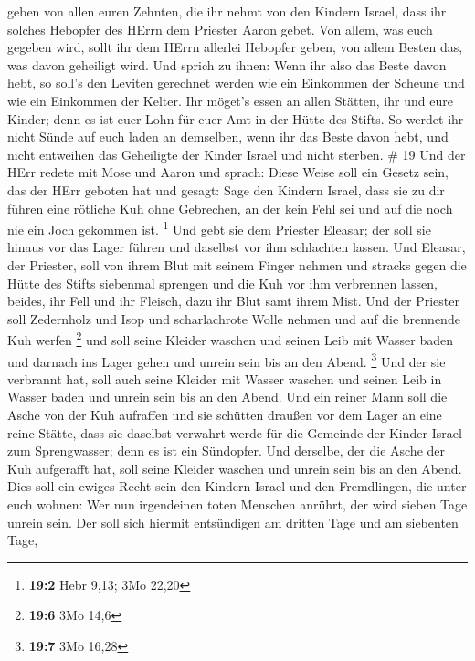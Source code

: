 geben von allen euren Zehnten, die ihr nehmt von den Kindern Israel,
dass ihr solches Hebopfer des HErrn dem Priester Aaron gebet.
 Von allem, was euch gegeben wird, sollt ihr dem HErrn
allerlei Hebopfer geben, von allem Besten das, was davon geheiligt wird.
 Und sprich zu ihnen: Wenn ihr also das Beste davon hebt,
so soll's den Leviten gerechnet werden wie ein Einkommen der Scheune und
wie ein Einkommen der Kelter.  Ihr möget's essen an allen
Stätten, ihr und eure Kinder; denn es ist euer Lohn für euer Amt in der
Hütte des Stifts.  So werdet ihr nicht Sünde auf euch laden
an demselben, wenn ihr das Beste davon hebt, und nicht entweihen das
Geheiligte der Kinder Israel und nicht sterben. \# 19  Und
der HErr redete mit Mose und Aaron und sprach:  Diese Weise
soll ein Gesetz sein, das der HErr geboten hat und gesagt: Sage den
Kindern Israel, dass sie zu dir führen eine rötliche Kuh ohne Gebrechen,
an der kein Fehl sei und auf die noch nie ein Joch gekommen ist.
\footnote{\textbf{19:2} Hebr 9,13; 3Mo 22,20}  Und gebt sie
dem Priester Eleasar; der soll sie hinaus vor das Lager führen und
daselbst vor ihm schlachten lassen.  Und Eleasar, der
Priester, soll von ihrem Blut mit seinem Finger nehmen und stracks gegen
die Hütte des Stifts siebenmal sprengen  und die Kuh vor ihm
verbrennen lassen, beides, ihr Fell und ihr Fleisch, dazu ihr Blut samt
ihrem Mist.  Und der Priester soll Zedernholz und Isop und
scharlachrote Wolle nehmen und auf die brennende Kuh werfen \footnote{\textbf{19:6}
  3Mo 14,6}  und soll seine Kleider waschen und seinen Leib
mit Wasser baden und darnach ins Lager gehen und unrein sein bis an den
Abend. \footnote{\textbf{19:7} 3Mo 16,28}  Und der sie
verbrannt hat, soll auch seine Kleider mit Wasser waschen und seinen
Leib in Wasser baden und unrein sein bis an den Abend.  Und
ein reiner Mann soll die Asche von der Kuh aufraffen und sie schütten
draußen vor dem Lager an eine reine Stätte, dass sie daselbst verwahrt
werde für die Gemeinde der Kinder Israel zum Sprengwasser; denn es ist
ein Sündopfer.  Und derselbe, der die Asche der Kuh
aufgerafft hat, soll seine Kleider waschen und unrein sein bis an den
Abend. Dies soll ein ewiges Recht sein den Kindern Israel und den
Fremdlingen, die unter euch wohnen:  Wer nun irgendeinen
toten Menschen anrührt, der wird sieben Tage unrein sein. 
Der soll sich hiermit entsündigen am dritten Tage und am siebenten Tage,
